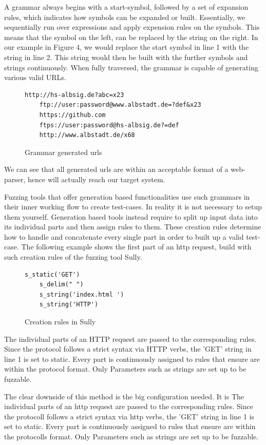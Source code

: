 \documentclass[journal=tosc,final]{iacrtrans}
\begin{document}
A grammar always begins with a start-symbol, followed by a set of expansion rules, which indicates how symbols can be expanded or built. 
Essentially, we sequentially run over expressions and apply expension rules on the symbols. This means that the symbol on the left, can be replaced by the string on the right. In our example in Figure 4, we would replace the start symbol in line 1 with the string in line 2. This string would then be built with the further symbols and strings continuously. When fully traversed, the grammar is capable of generating various valid URLs.
\begin{figure}[h]
 \caption{Grammar generated urls}
 \begin{lstlisting}[style=code]
	http://hs-albsig.de?abc=x23
	ftp://user:password@www.albstadt.de=?def&x23
	https://github.com
	ftps://user:password@hs-albsig.de?=def
	http://www.albstadt.de/x68
 \end{lstlisting} 
\end{figure}
\newpage
We can see that all generated urls are within an acceptable format of a web-parser, hence will actually reach our target system.

Fuzzing tools that offer generation based functionalities use such grammars in their inner working flow to create test-cases. In reality it is not necessary to setup them yourself. Generation based tools instead require to split up input data into its individual parts and then assign rules to them. These creation rules determine how to handle and concatenate every single part in order to built up a valid test-case. The following example shows the first part of an http request, build with such creation rules of the fuzzing tool Sully.
\begin{figure}[h]
 \caption{Creation rules in Sully}
 \begin{lstlisting}[style=code]
	s_static('GET')
	s_delim(" ")
	s_string('index.html ')
	s_string('HTTP')
 \end{lstlisting}
\end{figure}
The individual parts of an HTTP request are passed to the corresponding rules. Since the protocol follows a strict syntax via HTTP verbs, the 'GET' string in line 1 is set to static. Every part is continuously assigned to rules that ensure are within the protocol format. Only Parameters such as strings are set up to be fuzzable.
   
The clear downside of this method is the big configuration needed. It is The individual parts of an http request are passed to the corresponding rules. Since the protocoll follows a strict syntax via http verbs, the 'GET' string in line 1 is set to static. Every part is continuously assigned to rules that ensure are within the protocolls format. Only Parameters such as strings are set up to be fuzzable.
   
\end{document}
